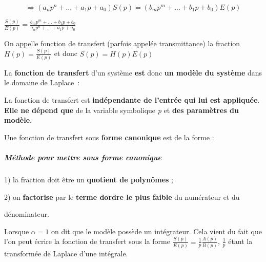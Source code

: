 \[\Longrightarrow \left( a_{n}p^{n} + \ldots + a_{1}p + a_{0} \right)S(p) = \left( b_{m}p^{m} + \ldots + b_{1}p + b_{0} \right)E(p)\]

\(\frac{S(p)}{E(p)} = \frac{b_{m}p^{m} + \ldots + b_{1}p + b_{0}}{a_{n}p^{n} + \ldots + a_{1}p + a_{0}}\)

On appelle fonction de transfert (parfois appelée transmittance) la fraction \(H(p) = \frac{S(p)}{E(p)}\) et donc \(S(p) = H(p)E(p)\)

La \textbf{fonction de transfert} d'un système \textbf{est} donc \textbf{un modèle du système} dans le domaine de Laplace~:

La fonction de transfert est \textbf{indépendante de l'entrée qui lui est appliquée}. \textbf{Elle ne dépend que} de la variable symbolique \emph{p} et \textbf{des paramètres du modèle}.

Une fonction de transfert sous \textbf{forme canonique} est de la forme :

\hypertarget{mod-muxe9thode-pour-mettre-sous-forme-canonique}{%
\subparagraph*{Méthode pour mettre sous forme canonique~}\label{mod-muxe9thode-pour-mettre-sous-forme-canonique}}

1) la fraction doit être un \textbf{quotient de polynômes} ;

2) on \textbf{factorise} par le \textbf{terme d\textquotesingle ordre le plus faible} du numérateur et du

dénominateur.

Lorsque \(\alpha = 1\) on dit que le modèle possède un intégrateur. Cela vient du fait que l'on peut écrire la fonction de transfert sous la forme \(\frac{S(p)}{E(p)} = \frac{1}{p}\frac{A(p)}{B(p)}\), \(\frac{1}{p}\) étant la transformée de Laplace d'une intégrale.


